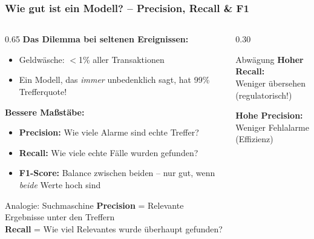 \documentclass[11pt, aspectratio=169]{beamer}
\begin{document}
\begin{frame}
    \frametitle{Wie gut ist ein Modell? -- Precision, Recall \& F1}
    \begin{columns}[t]
        \begin{column}{0.65\textwidth}
            \textbf{Das Dilemma bei seltenen Ereignissen:}
            \begin{itemize}
                \item Geldwäsche: $<$1\% aller Transaktionen
                \item Ein Modell, das \textit{immer} \glqq unbedenklich\grqq{} sagt, hat 99\% Trefferquote!
            \end{itemize}
            \vspace{0.3cm}
            \textbf{Bessere Maßstäbe:}
            \begin{itemize}
                \item \textbf{Precision:} Wie viele Alarme sind echte Treffer?
                \item \textbf{Recall:} Wie viele echte Fälle wurden gefunden?
                \item \textbf{F1-Score:} Balance zwischen beiden -- nur gut, wenn \textit{beide} Werte hoch sind
            \end{itemize}
            \vspace{0.3cm}
            \begin{exampleblock}{Analogie: Suchmaschine}
                \textbf{Precision} = Relevante Ergebnisse unter den Treffern\\                \textbf{Recall} = Wie viel Relevantes wurde überhaupt gefunden?
            \end{exampleblock}
        \end{column}
        \begin{column}{0.30\textwidth}
            \begin{alertblock}{Abwägung}
                \textbf{Hoher Recall:}\\
                Weniger übersehen\\
                {\small (regulatorisch!)}
                \vspace{0.15cm}
                
                \textbf{Hohe Precision:}\\
                Weniger Fehlalarme\\
                {\small (Effizienz)}
            \end{alertblock}
        \end{column}
    \end{columns}
\end{frame}
\end{document}
